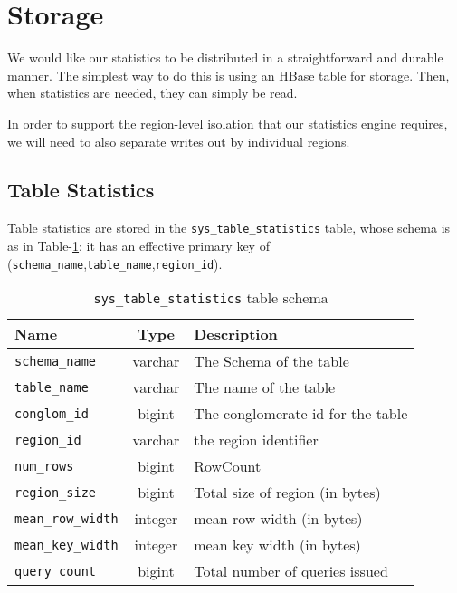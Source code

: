 \section{Storage}
We would like our statistics to be distributed in a straightforward and durable manner. The simplest way to do this is using an HBase table for storage. Then, when statistics are needed, they can simply be read.

In order to support the region-level isolation that our statistics engine requires, we will need to also separate writes out by individual regions. 

\subsection{Table Statistics}
Table statistics are stored in the \texttt{sys\_table\_statistics} table, whose schema is as in Table-\ref{table:tableStatistics}; it has an effective primary key of (\texttt{schema\_name},\texttt{table\_name},\texttt{region\_id}).

\begin{table}
				\begin{tabular}{|l|c|p{6cm}|}
								\hline
								\bf{Name}									& \bf{Type}	&	\bf{Description} \\ \hline	
								\texttt{schema\_name}			&	varchar	&	The Schema of the table \\ \hline
								\texttt{table\_name}			&	varchar	&	The name of the table \\ \hline
								\texttt{conglom\_id}			&	bigint	&	The conglomerate id for the table \\ \hline
								\texttt{region\_id}				&	varchar	&	the region identifier \\ \hline
								\texttt{num\_rows}				&	bigint	& RowCount \\ \hline
								\texttt{region\_size}			&	bigint	&	Total size of region (in bytes) \\ \hline
								\texttt{mean\_row\_width}	&	integer	&	mean row width (in bytes) \\ \hline
								\texttt{mean\_key\_width}	&	integer	&	mean key width (in bytes) \\ \hline
								\texttt{query\_count}			&	bigint	&	Total number of queries issued \\ \hline
				\end{tabular}
				\caption{\texttt{sys\_table\_statistics} table schema}
				\label{table:tableStatistics}
\end{table}

